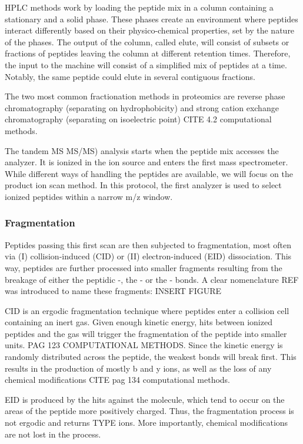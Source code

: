 \documentclass[11pt, a4paper]{report}
\begin{document}
\ac{HPLC} methods work by loading the peptide mix in a column containing a stationary and a solid phase. These phases create an environment where peptides interact differently based on their physico-chemical properties, set by the nature of the phases. The output of the column, called elute, will consist of subsets or fractions of peptides leaving the column at different retention times. Therefore, the input to the machine will consist of a simplified mix of peptides at a time. Notably, the same peptide could elute in several contiguous fractions.

The two most common fractionation methods in proteomics are reverse phase chromatography (separating on hydrophobicity) and strong cation exchange chromatography (separating on isoelectric point)  CITE 4.2 computational methods.

The tandem MS \ac{MS/MS}) analysis starts when the peptide mix accesses the analyzer. It is ionized in the ion source and enters the first mass spectrometer. While different ways of handling the peptides are available, we will focus on the product ion scan method. In this protocol, the first analyzer is used to select ionized peptides within a narrow m/z window.


\subsubsection{Fragmentation}

Peptides passing this first scan are then subjected to fragmentation, most often via (I) collision-induced (CID) or (II) electron-induced (EID) dissociation. This way, peptides are further processed into smaller fragments resulting from the breakage of either the peptidic -, the - or the - bonds. A clear nomenclature REF was introduced to name these fragments: INSERT FIGURE

CID is an ergodic fragmentation technique where peptides enter a collision cell containing an inert gas. Given enough kinetic energy, hits between ionized peptides and the gas will trigger the fragmentation of the peptide into smaller units. PAG 123 COMPUTATIONAL METHODS. Since the kinetic energy is randomly distributed across the peptide, the weakest bonds will break first. This results in the production of mostly b and y ions, as well as the loss of any chemical modifications CITE pag 134 computational methods.

EID is produced by the hits against the molecule, which tend to occur on the areas of the peptide more positively charged. Thus, the fragmentation process is not ergodic and returns TYPE ions. More importantly, chemical modifications are not lost in the process.
\end{document}
